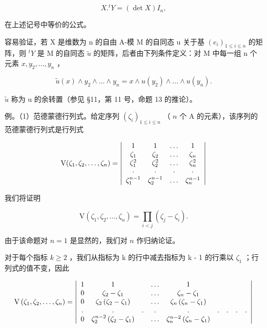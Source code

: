 \[
X. ^ {t} Y = (\det X) I _ {n},\tag{28}
\]

在上述记号中等价的公式。

容易验证，若 X 是维数为 n 的自由 A-模 M 的自同态 u 关于基 \((e_{i})_{1\leq i\leq n}\) 的矩阵，则 \(^{t}Y\) 是 M 的自同态 \(\tilde{u}\) 的矩阵，后者由下列条件定义：对 M 中每一组 n 个元素 \(x, y_{2}, \ldots, y_{n}\) ，

\[
\tilde {u} (x) \wedge y _ {2} \wedge \dots \wedge y _ {n} = x \wedge u (y _ {2}) \wedge \dots \wedge u (y _ {n}).
\]

\(\tilde{u}\) 称为 u 的余转置（参见 §11，第 11 号，命题 13 的推论）。

例。（1）范德蒙德行列式。给定序列 \((\zeta_{i})_{1\leqslant i\leqslant n}\) （ \(n\) 个 A 的元素），该序列的范德蒙德行列式是行列式

\[
\mathrm{V} (\zeta_ {1}, \zeta_ {2}, \dots , \zeta_ {n}) = \left| \begin{array}{c c c c} 1 & 1 & \dots & 1 \\ \zeta_ {1} & \zeta_ {2} & \dots & \zeta_ {n} \\ \zeta_ {1} ^ {2} & \zeta_ {2} ^ {2} & \dots & \zeta_ {n} ^ {2} \\ \cdot & \cdot & \cdot & \cdot \\ \zeta_ {1} ^ {n - 1} & \zeta_ {2} ^ {n - 1} & \dots & \zeta_ {n} ^ {n - 1} \end{array} \right|
\]

我们将证明

\[
\mathrm{V} \left(\zeta_ {1}, \zeta_ {2}, \dots , \zeta_ {n}\right) = \prod_ {i <   j} \left(\zeta_ {j} - \zeta_ {i}\right).\tag{29}
\]

由于该命题对 \(n = 1\) 是显然的，我们对 \(n\) 作归纳论证。

对于每个指标 \(k \geqslant 2\) ，我们从指标为 k 的行中减去指标为 k - 1 的行乘以 \(\zeta_{1}\) ；行列式的值不变，因此

\[
\mathrm{V} \left(\zeta_ {1}, \zeta_ {2}, \dots , \zeta_ {n}\right) = \left| \begin{array}{c c c c c c c c c} 1 & 1 & & \dots & 1 \\ 0 & \zeta_ {2} - \zeta_ {1} & & \dots & \zeta_ {n} - \zeta_ {1} \\ 0 & \zeta_ {2} \left(\zeta_ {2} - \zeta_ {1}\right) & & \dots & \zeta_ {n} \left(\zeta_ {n} - \zeta_ {1}\right) \\ . & . & . & . & . & . & . & . & . \\ 0 & \zeta_ {2} ^ {n - 2} \left(\zeta_ {2} - \zeta_ {1}\right) & & \dots & \zeta_ {n} ^ {n - 2} \left(\zeta_ {n} - \zeta_ {1}\right) \end{array} \right|
\]

